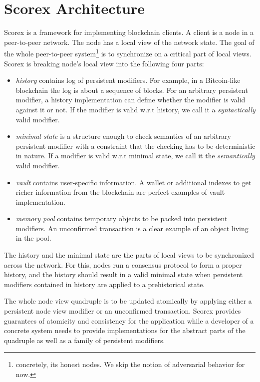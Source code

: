 
\section{Scorex Architecture}

Scorex is a framework for implementing blockchain clients. A client is a node in a peer-to-peer network. The node has a local view of the network state. The goal of the whole peer-to-peer system\footnote{concretely, its honest nodes. We skip the notion of adversarial behavior for now.} is to synchronize on a critical part of local views. Scorex is breaking node's local view into the following four parts: 

\begin{itemize}
\item{\em history} contains log of persistent modifiers. For example, in a Bitcoin-like blockchain the log is about a sequence of blocks. For an arbitrary persistent modifier, a history implementation can define whether the modifier is valid against it or not.
If the modifier is valid w.r.t history, we call it a {\em syntactically} valid modifier.   
\item{\em minimal state} is a structure enough to check semantics of an arbitrary persistent modifier with a constraint that the checking has to be deterministic in nature. If a modifier is valid w.r.t minimal state, we call it the {\em semantically} valid modifier.
\item{\em vault} contains user-specific information. A wallet or additional indexes to get richer information from the blockchain are perfect examples of vault implementation. 
\item{\em memory pool} contains temporary objects to be packed into persistent modifiers. An unconfirmed transaction is a clear example of an object living in the pool.
\end{itemize}

The history and the minimal state are the parts of local views to be synchronized across the network. For this, nodes run a consensus protocol to form a proper history, and the history should result in a valid minimal state when persistent modifiers contained in history are applied to a prehistorical state.

The whole node view quadruple is to be updated atomically by applying either a persistent node view modifier or an unconfirmed transaction. Scorex provides guarantees of atomicity and consistency for the application while a developer of a concrete system needs to provide implementations for the abstract parts of the quadruple as well as a family of persistent modifiers.

